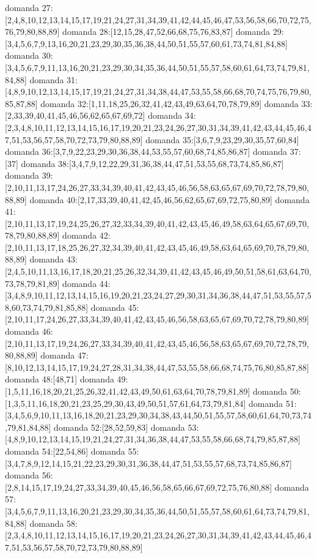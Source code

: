 domanda 27:[2,4,8,10,12,13,14,15,17,19,21,24,27,31,34,39,41,42,44,45,46,47,53,56,58,66,70,72,75,76,79,80,88,89]
domanda 28:[12,15,28,47,52,66,68,75,76,83,87]
domanda 29:[3,4,5,6,7,9,13,16,20,21,23,29,30,35,36,38,44,50,51,55,57,60,61,73,74,81,84,88]
domanda 30:[3,4,5,6,7,9,11,13,16,20,21,23,29,30,34,35,36,44,50,51,55,57,58,60,61,64,73,74,79,81,84,88]
domanda 31:[4,8,9,10,12,13,14,15,17,19,21,24,27,31,34,38,44,47,53,55,58,66,68,70,74,75,76,79,80,85,87,88]
domanda 32:[1,11,18,25,26,32,41,42,43,49,63,64,70,78,79,89]
domanda 33:[2,33,39,40,41,45,46,56,62,65,67,69,72]
domanda 34:[2,3,4,8,10,11,12,13,14,15,16,17,19,20,21,23,24,26,27,30,31,34,39,41,42,43,44,45,46,47,51,53,56,57,58,70,72,73,79,80,88,89]
domanda 35:[3,6,7,9,23,29,30,35,57,60,84]
domanda 36:[3,7,9,22,23,29,30,36,38,44,53,55,57,60,68,74,85,86,87]
domanda 37:[37]
domanda 38:[3,4,7,9,12,22,29,31,36,38,44,47,51,53,55,68,73,74,85,86,87]
domanda 39:[2,10,11,13,17,24,26,27,33,34,39,40,41,42,43,45,46,56,58,63,65,67,69,70,72,78,79,80,88,89]
domanda 40:[2,17,33,39,40,41,42,45,46,56,62,65,67,69,72,75,80,89]
domanda 41:[2,10,11,13,17,19,24,25,26,27,32,33,34,39,40,41,42,43,45,46,49,58,63,64,65,67,69,70,78,79,80,88,89]
domanda 42:[2,10,11,13,17,18,25,26,27,32,34,39,40,41,42,43,45,46,49,58,63,64,65,69,70,78,79,80,88,89]
domanda 43:[2,4,5,10,11,13,16,17,18,20,21,25,26,32,34,39,41,42,43,45,46,49,50,51,58,61,63,64,70,73,78,79,81,89]
domanda 44:[3,4,8,9,10,11,12,13,14,15,16,19,20,21,23,24,27,29,30,31,34,36,38,44,47,51,53,55,57,58,60,73,74,79,81,85,88]
domanda 45:[2,10,11,17,24,26,27,33,34,39,40,41,42,43,45,46,56,58,63,65,67,69,70,72,78,79,80,89]
domanda 46:[2,10,11,13,17,19,24,26,27,33,34,39,40,41,42,43,45,46,56,58,63,65,67,69,70,72,78,79,80,88,89]
domanda 47:[8,10,12,13,14,15,17,19,24,27,28,31,34,38,44,47,53,55,58,66,68,74,75,76,80,85,87,88]
domanda 48:[48,71]
domanda 49:[1,5,11,16,18,20,21,25,26,32,41,42,43,49,50,61,63,64,70,78,79,81,89]
domanda 50:[1,3,5,11,16,18,20,21,23,25,29,30,43,49,50,51,57,61,64,73,79,81,84]
domanda 51:[3,4,5,6,9,10,11,13,16,18,20,21,23,29,30,34,38,43,44,50,51,55,57,58,60,61,64,70,73,74,79,81,84,88]
domanda 52:[28,52,59,83]
domanda 53:[4,8,9,10,12,13,14,15,19,21,24,27,31,34,36,38,44,47,53,55,58,66,68,74,79,85,87,88]
domanda 54:[22,54,86]
domanda 55:[3,4,7,8,9,12,14,15,21,22,23,29,30,31,36,38,44,47,51,53,55,57,68,73,74,85,86,87]
domanda 56:[2,8,14,15,17,19,24,27,33,34,39,40,45,46,56,58,65,66,67,69,72,75,76,80,88]
domanda 57:[3,4,5,6,7,9,11,13,16,20,21,23,29,30,34,35,36,44,50,51,55,57,58,60,61,64,73,74,79,81,84,88]
domanda 58:[2,3,4,8,10,11,12,13,14,15,16,17,19,20,21,23,24,26,27,30,31,34,39,41,42,43,44,45,46,47,51,53,56,57,58,70,72,73,79,80,88,89]
